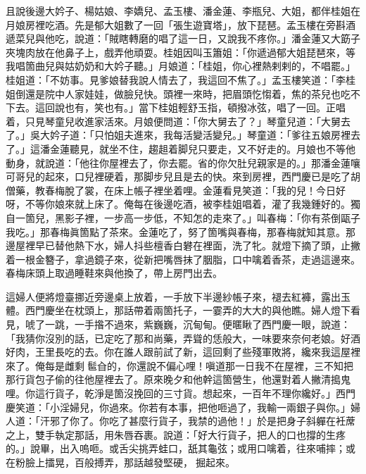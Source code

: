 且說後邊大妗子、楊姑娘、李嬌兒、孟玉樓、潘金蓮、李瓶兒、大姐，都伴桂姐在月娘房裡吃酒。先是郁大姐數了一回「張生遊寶塔」，放下琵琶。孟玉樓在旁斟酒遞菜兒與他吃，說道：「賊瞎轉磨的唱了這一日，又說我不疼你。」潘金蓮又大筯子夾塊肉放在他鼻子上，戲弄他頑耍。桂姐因叫玉簫姐：「你遞過郁大姐琵琶來，等我唱箇曲兒與姑奶奶和大妗子聽。」月娘道：「桂姐，你心裡熱剌剌的，不唱罷。」桂姐道：「不妨事。見爹娘替我說人情去了，我這回不焦了。」孟玉樓笑道：「李桂姐倒還是院中人家娃娃，做臉兒快。頭裡一來時，把眉頭忔㥮着，焦的茶兒也吃不下去。{}這回說也有，笑也有。」當下桂姐輕舒玉指，頓撥冰弦，唱了一回。正唱着，只見琴童兒收進家活來。月娘便問道：「你大舅去了？」琴童兒道：「大舅去了。」吳大妗子道：「只怕姐夫進來，我每活變活變兒。」琴童道：「爹往五娘房裡去了。」這潘金蓮聽見，就坐不住，趨趄着脚兒只要走，又不好走的。{}月娘也不等他動身，就說道：「他往你屋裡去了，你去罷。省的你欠肚兒親家是的。」{}那潘金蓮嚷可哥兒的起來，口兒裡硬着，那脚步兒且是去的快。來到房裡，西門慶已是吃了胡僧藥，教春梅脫了裳，在床上帳子裡坐着哩。金蓮看見笑道：「我的兒！今日好呀，不等你娘來就上床了。俺每在後邊吃酒，被李桂姐唱着，灌了我幾鍾好的。獨自一箇兒，黑影子裡，一步高一步低，不知怎的走來了。」{}叫春梅：「你有茶倒甌子我吃。」那春梅眞箇點了茶來。金蓮吃了，努了箇嘴與春梅，那春梅就知其意。{}那邊屋裡早已替他熱下水，婦人抖些檀香白礬在裡面，{}洗了牝。就燈下摘了頭，止撇着一根金簪子，拿過鏡子來，從新把嘴唇抹了胭脂，口中噙着香茶，走過這邊來。春梅床頭上取過睡鞋來與他換了，帶上房門出去。

這婦人便將燈臺挪近旁邊桌上放着，一手放下半邊紗帳子來，褪去紅褲，露出玉體。西門慶坐在枕頭上，那話帶着兩箇托子，一霎弄的大大的與他瞧。婦人燈下看見，唬了一跳，一手揝不過來，紫巍巍，沉甸甸。便暱瞅了西門慶一眼，說道：「我猜你沒別的話，已定吃了那和尚藥，{}弄聳的恁般大，一味要來奈何老娘。好酒好肉，王里長吃的去。你在誰人跟前試了新，這回剩了些殘軍敗將，{}纔來我這屋裡來了。俺每是雌剩𩫻䯲㒲的，你還說不偏心哩！嗔道那一日我不在屋裡，三不知把那行貨包子偷的往他屋裡去了。原來晚夕和他幹這箇營生，他還對着人撇清搗鬼哩。你這行貨子，乾淨是箇沒挽回的三寸貨。想起來，一百年不理你纔好。」西門慶笑道：「小淫婦兒，你過來。你若有本事，把他咂過了，我輸一兩銀子與你。」婦人道：「汗邪了你了。你吃了甚麼行貨子，我禁的過他！」於是把身子斜軃在衽蓆之上，雙手執定那話，用朱唇吞裹。說道：「好大行貨子，把人的口也撐的生疼的。」說畢，出入嗚咂。或舌尖挑弄蛙口，舐其龜弦；或用口噙着，往來哺摔；或在粉臉上擂晃，百般搏弄，那話越發堅硬，𢳥掘起來。


